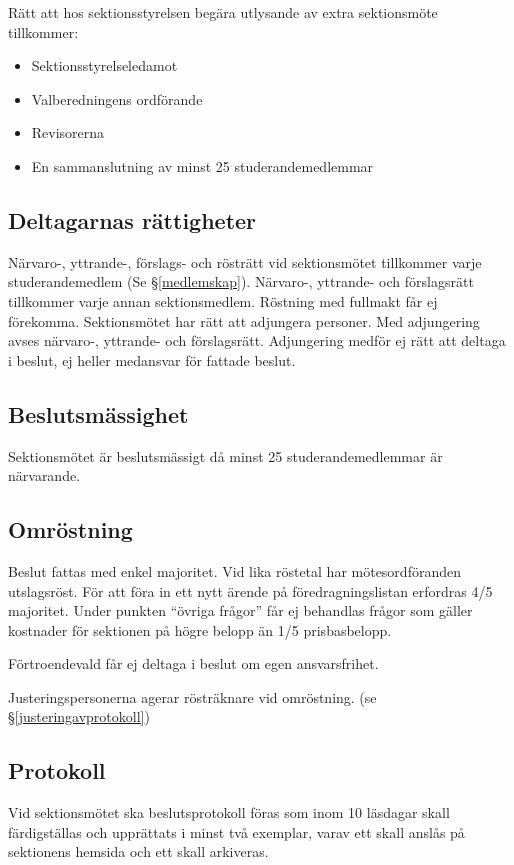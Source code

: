 \documentclass{datateknologsektionen-document}
\begin{document}
      Rätt att hos sektionsstyrelsen begära utlysande av extra sektionsmöte tillkommer:
      \begin{itemize}
        \item Sektionsstyrelseledamot
        \item Valberedningens ordförande
        \item Revisorerna
        \item En sammanslutning av minst 25 studerandemedlemmar
      \end{itemize}
      
    \subsection{Deltagarnas rättigheter}
      Närvaro-, yttrande-, förslags- och rösträtt vid sektionsmötet tillkommer varje
      studerandemedlem (Se \S \ref{medlemskap}). Närvaro-, yttrande- och förslagsrätt tillkommer varje annan
      sektionsmedlem. Röstning med fullmakt får ej förekomma. Sektionsmötet har rätt att
      adjungera personer. Med adjungering avses närvaro-, yttrande- och förslagsrätt.
      Adjungering medför ej rätt att deltaga i beslut, ej heller medansvar för fattade beslut.
    \subsection{Beslutsmässighet}
      Sektionsmötet är beslutsmässigt då minst 25 studerandemedlemmar är närvarande.
    \subsection{Omröstning}
      Beslut fattas med enkel majoritet. Vid lika röstetal har mötesordföranden utslagsröst.
      För att föra in ett nytt ärende på föredragningslistan erfordras 4/5 majoritet. Under
      punkten ``övriga frågor'' får ej behandlas frågor som gäller kostnader för sektionen på
      högre belopp än 1/5 prisbasbelopp.

      Förtroendevald får ej deltaga i beslut om egen ansvarsfrihet.

      Justeringspersonerna agerar rösträknare vid omröstning. (se \S \ref{justeringavprotokoll})
    \subsection{Protokoll}
      Vid sektionsmötet ska beslutsprotokoll föras som inom 10 läsdagar skall färdigställas
      och upprättats i minst två exemplar, varav ett skall anslås på sektionens hemsida och ett
      skall arkiveras.
\end{document}
